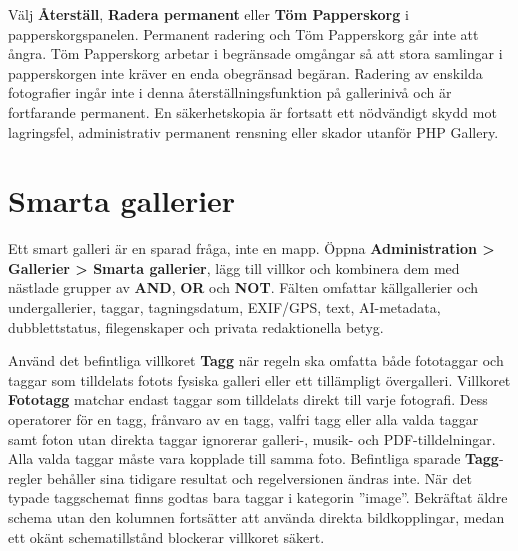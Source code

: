 \documentclass[11pt,a4paper]{article}
\newcommand{\ui}[1]{\textbf{#1}}
\begin{document}
Välj \ui{Återställ}, \ui{Radera permanent} eller \ui{Töm Papperskorg} i
papperskorgspanelen. Permanent radering och Töm Papperskorg går inte att ångra.
Töm Papperskorg arbetar i begränsade omgångar så att stora samlingar i
papperskorgen inte kräver en enda obegränsad begäran. Radering av enskilda
fotografier ingår inte i denna återställningsfunktion på gallerinivå och är
fortfarande permanent. En säkerhetskopia är fortsatt ett nödvändigt skydd mot
lagringsfel, administrativ permanent rensning eller skador utanför PHP Gallery.
\section{Smarta gallerier}

Ett smart galleri är en sparad fråga, inte en mapp. Öppna \ui{Administration >
Gallerier > Smarta gallerier}, lägg till villkor och kombinera dem med nästlade
grupper av \ui{AND}, \ui{OR} och \ui{NOT}. Fälten omfattar källgallerier och
undergallerier, taggar, tagningsdatum, EXIF/GPS, text, AI-metadata,
dubblettstatus, filegenskaper och privata redaktionella betyg.

Använd det befintliga villkoret \ui{Tagg} när regeln ska omfatta både fototaggar
och taggar som tilldelats fotots fysiska galleri eller ett tillämpligt
övergalleri.
Villkoret \ui{Fototagg} matchar endast taggar som tilldelats direkt till varje
fotografi. Dess operatorer för en tagg, frånvaro av en tagg, valfri tagg eller
alla valda taggar samt foton utan direkta taggar ignorerar galleri-, musik- och
PDF-tilldelningar. Alla valda taggar måste vara kopplade till samma foto.
Befintliga sparade \ui{Tagg}-regler behåller sina tidigare resultat och
regelversionen ändras inte. När det typade taggschemat finns godtas bara taggar
i kategorin ”image”. Bekräftat äldre schema utan den kolumnen fortsätter att
använda direkta bildkopplingar, medan ett okänt schematillstånd blockerar
villkoret säkert.
\end{document}

